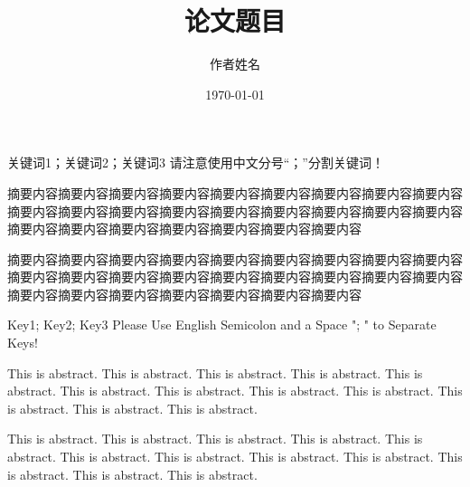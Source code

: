 \documentclass[supercite]{HustGraduPaper}
\title{论文题目} %
\author{作者姓名} %
\date{\today} %
\begin{document}
	\maketitle
	
	\statement
	
	\clearpage %
	
	\begin{cnabstract}{关键词1；关键词2；关键词3}
		请注意使用中文分号“；”分割关键词！
		
		摘要内容摘要内容摘要内容摘要内容摘要内容摘要内容摘要内容摘要内容摘要内容摘要内容摘要内容摘要内容摘要内容摘要内容摘要内容摘要内容摘要内容摘要内容摘要内容摘要内容摘要内容摘要内容摘要内容摘要内容摘要内容
		
		摘要内容摘要内容摘要内容摘要内容摘要内容摘要内容摘要内容摘要内容摘要内容摘要内容摘要内容摘要内容摘要内容摘要内容摘要内容摘要内容摘要内容摘要内容摘要内容摘要内容摘要内容摘要内容摘要内容摘要内容摘要内容
  
	\end{cnabstract}
	\begin{enabstract}{Key1; Key2; Key3}
		Please Use English Semicolon and a Space "; " to Separate  Keys! 
		
		This is abstract. This is abstract. This is abstract. This is abstract. This is abstract. This is abstract. This is abstract. This is abstract. This is abstract. This is abstract. This is abstract. This is abstract. 
		
		This is abstract. This is abstract. This is abstract. This is abstract. This is abstract. This is abstract. This is abstract. This is abstract. This is abstract. This is abstract. This is abstract. This is abstract. 
	\end{enabstract}
	
\end{document}
